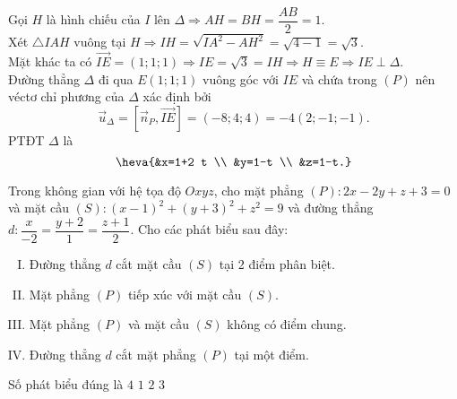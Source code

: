\begin{ex}
{	Gọi $H$ là hình chiếu của $I$ lên $\Delta \Rightarrow A H=B H=\dfrac{A B}{2}=1$.\\
	Xét $\triangle I A H$ vuông tại $H \Rightarrow I H=\sqrt{I A^2-A H^2}=\sqrt{4-1}=\sqrt{3}$.\\
	Mặt khác ta có $\overrightarrow{I E}=(1; 1; 1) \Rightarrow I E=\sqrt{3}=I H \Rightarrow H \equiv E \Rightarrow I E \perp \Delta$.\\
	Đường thẳng $\Delta$ đi qua $E(1; 1; 1)$ vuông góc với $I E$ và chứa trong $(P)$ nên	véctơ chỉ phương của $\Delta$ xác định bởi $$\overrightarrow{u}_{\Delta}=\left[\overrightarrow{n}_P, \overrightarrow{I E}\right]=(-8; 4; 4)=-4(2;-1;-1).$$
	PTĐT $\Delta$ là $$\heva{&x=1+2 t \\ &y=1-t \\ &z=1-t.}$$	
	}
\end{ex}
\begin{ex}%
	Trong không gian với hệ tọa độ $O x y z$, cho mặt phẳng $(P)\colon 2 x-2 y+z+3=0$ và mặt cầu $(S)\colon(x-1)^2+(y+3)^2+z^2=9$ và đường thẳng $d\colon \dfrac{x}{-2}=\dfrac{y+2}{1}=\dfrac{z+1}{2}$. Cho các phát biểu sau đây:
	\begin{enumerate}[I. ]
	\item Đường thẳng $d$ cắt mặt cầu $(S)$ tại 2 điểm phân biệt.
	\item Mặt phẳng $(P)$ tiếp xúc với mặt cầu $(S)$.
	\item Mặt phẳng $(P)$ và mặt cầu $(S)$ không có điểm chung.
	\item Đường thẳng $d$ cắt mặt phẳng $(P)$ tại một điểm.	
	\end{enumerate}
	Số phát biểu đúng là
	\choice
	{$4$}
	{$1$}
	{$2$}
	{\True $3$}
\end{ex} 

